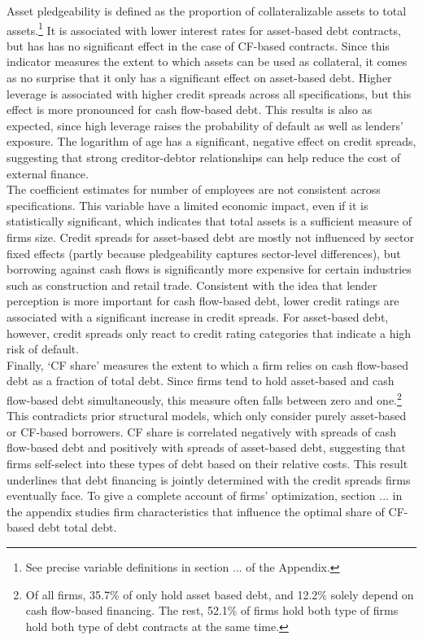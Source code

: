 \documentclass[12pt]{article}
\begin{document}
Asset pledgeability is defined as the proportion of collateralizable assets to total assets.\footnote{See precise variable definitions in section ... of the Appendix.} It is associated with lower interest rates for asset-based debt contracts, but has has no significant effect in the case of CF-based contracts. Since this indicator measures the extent to which assets can be used as collateral, it comes as no surprise that it only has a significant effect on asset-based debt. Higher leverage is associated with higher credit spreads across all specifications, but this effect is more pronounced for cash flow-based debt. This results is also as expected, since high leverage raises the probability of default as well as lenders' exposure. The logarithm of age has a significant, negative effect on credit spreads, suggesting that strong creditor-debtor relationships can help reduce the cost of external finance.  \vspace{3mm} \\
The coefficient estimates for number of employees are not consistent across specifications. This variable have a limited economic impact, even if it is statistically significant, which indicates that total assets is a sufficient measure of firms size. Credit spreads for asset-based debt are mostly not influenced by sector fixed effects (partly because pledgeability captures sector-level differences), but borrowing against cash flows is significantly more expensive for certain industries such as construction and retail trade. Consistent with the idea that lender perception is more important for cash flow-based debt, lower credit ratings are associated with a significant increase in credit spreads. For asset-based debt, however, credit spreads only react to credit rating categories that indicate a high risk of default.  \vspace{3mm} \\
Finally, `CF share' measures the extent to which a firm relies on cash flow-based debt as a fraction of total debt. Since firms tend to hold asset-based and cash flow-based debt simultaneously, this measure often falls between zero and one.\footnote{Of all firms, 35.7\% of only hold asset based debt, and 12.2\% solely depend on cash flow-based financing. The rest, 52.1\% of firms hold both type of firms hold both type of debt contracts at the same time.} This contradicts prior structural models, which only consider purely asset-based or CF-based borrowers. CF share is correlated negatively with spreads of cash flow-based debt and positively with spreads of asset-based debt, suggesting that firms self-select into these types of debt based on their relative costs. This result underlines that debt financing is jointly determined with the credit spreads firms eventually face. To give a complete account of firms' optimization, section ... in the appendix studies firm characteristics that influence the optimal share of CF-based debt total debt. 
\end{document}

